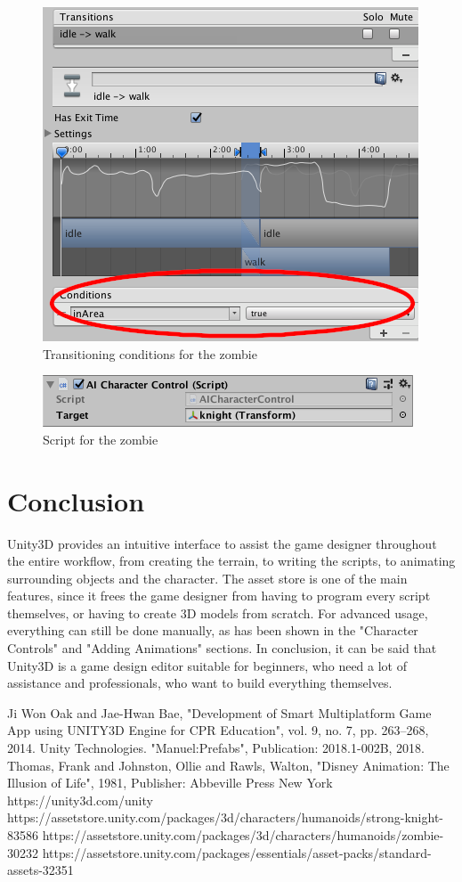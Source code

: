 \documentclass[12pt, a4paper, titlepage]{article}
\begin{document}
\begin{figure}[htbp]
  \centering
  \includegraphics[width=.4\textwidth]{pictures/zombie_transition}
  \caption{Transitioning conditions for the zombie}
  \label{fig:adding_animations_zombie_transition}
\end{figure}

\begin{figure}[htbp]
  \centering
  \includegraphics[width=.4\textwidth]{pictures/zombie_script}
  \caption{Script for the zombie}
  \label{fig:adding_animations_zombie_script}
\end{figure}

\section{Conclusion}

Unity3D provides an intuitive interface to assist the game designer throughout the entire workflow, from creating the terrain, to writing the scripts, to animating surrounding objects and the character. The asset store is one of the main features, since it frees the game designer from having to program every script themselves, or having to create 3D models from scratch. For advanced usage, everything can still be done manually, as has been shown in the "Character Controls" and "Adding Animations" sections. In conclusion, it can be said that Unity3D is a game design editor suitable for beginners, who need a lot of assistance and professionals, who want to build everything themselves.


\begin{thebibliography}{00}
 Ji Won Oak and Jae-Hwan Bae, "Development of Smart Multiplatform Game App using UNITY3D Engine for CPR Education", vol. 9, no. 7, pp. 263--268, 2014.
 Unity Technologies. "Manuel:Prefabs", Publication: 2018.1-002B, 2018.
 Thomas, Frank and Johnston, Ollie and Rawls, Walton, "Disney Animation: The Illusion of Life", 1981, Publisher: Abbeville Press New York
 https://unity3d.com/unity
 https://assetstore.unity.com/packages/3d/characters/humanoids/strong-knight-83586
 https://assetstore.unity.com/packages/3d/characters/humanoids/zombie-30232 
 https://assetstore.unity.com/packages/essentials/asset-packs/standard-assets-32351
\end{thebibliography}
\end{document}
